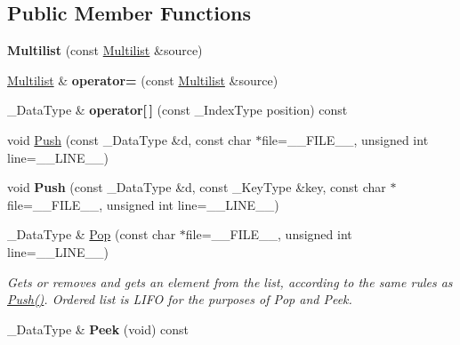 \subsection*{Public Member Functions}
\begin{DoxyCompactItemize}
\item 
\hypertarget{class_data_structures_1_1_multilist_a8a37f6b9891411ea3e14410e8b12cfcb}{{\bfseries Multilist} (const \hyperlink{class_data_structures_1_1_multilist}{Multilist} \&source)}\label{class_data_structures_1_1_multilist_a8a37f6b9891411ea3e14410e8b12cfcb}

\item 
\hypertarget{class_data_structures_1_1_multilist_a3ebd3513d069580696df82f1ae805789}{\hyperlink{class_data_structures_1_1_multilist}{Multilist} \& {\bfseries operator=} (const \hyperlink{class_data_structures_1_1_multilist}{Multilist} \&source)}\label{class_data_structures_1_1_multilist_a3ebd3513d069580696df82f1ae805789}

\item 
\hypertarget{class_data_structures_1_1_multilist_a11484761bc2c4d578915db64e1945671}{\-\_\-\-Data\-Type \& {\bfseries operator\mbox{[}$\,$\mbox{]}} (const \-\_\-\-Index\-Type position) const }\label{class_data_structures_1_1_multilist_a11484761bc2c4d578915db64e1945671}

\item 
void \hyperlink{class_data_structures_1_1_multilist_afe3f119b9f715a88fc6dd356689f7e72}{Push} (const \-\_\-\-Data\-Type \&d, const char $\ast$file=\-\_\-\-\_\-\-F\-I\-L\-E\-\_\-\-\_\-, unsigned int line=\-\_\-\-\_\-\-L\-I\-N\-E\-\_\-\-\_\-)
\item 
\hypertarget{class_data_structures_1_1_multilist_ae75f817a5d9980df4c4ad941a7edd6a5}{void {\bfseries Push} (const \-\_\-\-Data\-Type \&d, const \-\_\-\-Key\-Type \&key, const char $\ast$file=\-\_\-\-\_\-\-F\-I\-L\-E\-\_\-\-\_\-, unsigned int line=\-\_\-\-\_\-\-L\-I\-N\-E\-\_\-\-\_\-)}\label{class_data_structures_1_1_multilist_ae75f817a5d9980df4c4ad941a7edd6a5}

\item 
\hypertarget{class_data_structures_1_1_multilist_a09e7c33fe9587c1902ed1551d720f7b7}{\-\_\-\-Data\-Type \& \hyperlink{class_data_structures_1_1_multilist_a09e7c33fe9587c1902ed1551d720f7b7}{Pop} (const char $\ast$file=\-\_\-\-\_\-\-F\-I\-L\-E\-\_\-\-\_\-, unsigned int line=\-\_\-\-\_\-\-L\-I\-N\-E\-\_\-\-\_\-)}\label{class_data_structures_1_1_multilist_a09e7c33fe9587c1902ed1551d720f7b7}

\begin{DoxyCompactList}\small\item\em Gets or removes and gets an element from the list, according to the same rules as \hyperlink{class_data_structures_1_1_multilist_afe3f119b9f715a88fc6dd356689f7e72}{Push()}. Ordered list is L\-I\-F\-O for the purposes of Pop and Peek. \end{DoxyCompactList}\item 
\hypertarget{class_data_structures_1_1_multilist_a8ac2e4785ce35dc061cd6b1cff5ac721}{\-\_\-\-Data\-Type \& {\bfseries Peek} (void) const }\label{class_data_structures_1_1_multilist_a8ac2e4785ce35dc061cd6b1cff5ac721}


\end{DoxyCompactItemize}
